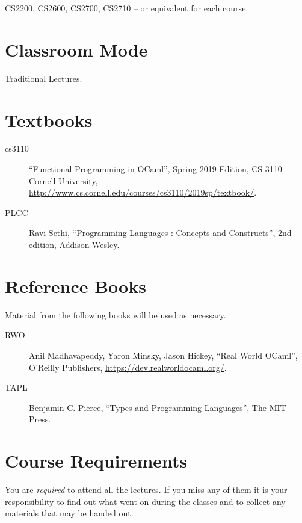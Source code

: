 \documentclass[10pt]{article}
\begin{document}
CS2200, CS2600, CS2700, CS2710 -- or equivalent for each course.

\section{Classroom Mode}

Traditional Lectures.

\section{Textbooks}

\begin{description}

\item[cs3110] ``Functional Programming in OCaml'', Spring 2019 Edition, CS 3110
	Cornell University, \url{http://www.cs.cornell.edu/courses/cs3110/2019sp/textbook/}.

\item [PLCC] Ravi Sethi, ``Programming Languages : Concepts and Constructs'',
	2nd edition, Addison-Wesley.

\end{description}

\section{Reference Books}

Material from the following books will be used as necessary.

\begin{description}

\item [RWO] Anil Madhavapeddy, Yaron Minsky, Jason Hickey, ``Real World
	OCaml'', O'Reilly Publishers, \url{https://dev.realworldocaml.org/}.

\item [TAPL] Benjamin C. Pierce, ``Types and Programming Languages'', The MIT Press.

\end{description}

\section{Course Requirements}

You are {\em required} to attend all the lectures.  If you miss any of them it
is your responsibility to find out what went on during the classes and to
collect any materials that may be handed out.
\end{document}
